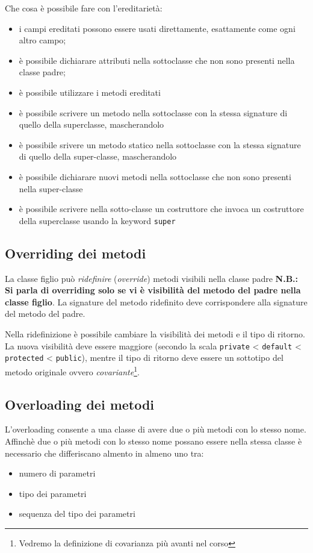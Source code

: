 \documentclass{article}
\begin{document}
Che cosa \`e possibile fare con l'ereditariet\`a:
\begin{itemize}
\item i campi ereditati possono essere usati direttamente, esattamente come ogni altro campo;
\item \`e possibile dichiarare attributi nella sottoclasse che non sono presenti nella classe padre;
\item \`e possibile utilizzare i metodi ereditati
\item \`e possibile scrivere un metodo nella sottoclasse con la stessa signature di quello della superclasse, mascherandolo
\item \`e possibile srivere un metodo statico nella sottoclasse con la stessa signature di quello della super-classe, mascherandolo
\item \`e possibile dichiarare nuovi metodi nella sottoclasse che non sono presenti nella super-classe
\item \`e possibile scrivere nella sotto-classe un costruttore che invoca un costruttore della superclasse usando la keyword \texttt{super}
\end{itemize}


\subsection{Overriding dei metodi}
La classe figlio può \emph{ridefinire} (\emph{override}) metodi visibili nella classe padre
\textbf{N.B.: Si parla di overriding solo se vi è visibilit\`a del metodo del padre nella classe figlio}.
La signature del metodo ridefinito deve corrispondere alla signature del metodo del padre.

Nella ridefinizione è possibile cambiare la visibilità dei metodi e il tipo di ritorno.
La nuova visibilità deve essere maggiore (secondo la scala \texttt{private} < \texttt{default} < \texttt{protected} < \texttt{public}), mentre il tipo di ritorno deve essere un sottotipo del metodo
originale ovvero \emph{covariante}\footnote{Vedremo la definizione di covarianza pi\`u avanti nel corso}.

\subsection{Overloading dei metodi}
L'overloading consente a una classe di avere due o pi\`u metodi con lo stesso nome. 
Affinch\`e due o pi\`u metodi con lo stesso nome possano essere nella stessa classe \`e necessario che differiscano almento in almeno uno tra:
\begin{itemize}
\item numero di parametri
\item tipo dei parametri
\item sequenza del tipo dei parametri
\end{itemize}
\end{document}
